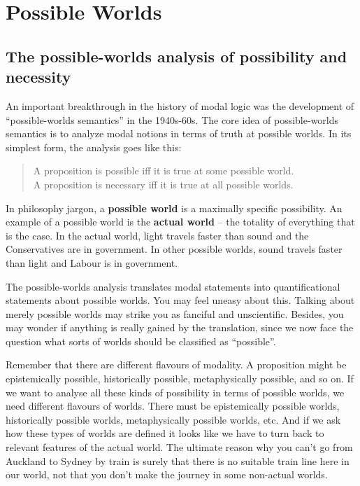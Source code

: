 \chapter{Possible Worlds}\label{ch:worlds}

\section{The possible-worlds analysis of possibility and necessity}

An important breakthrough in the history of modal logic was the development of
``possible-worlds semantics'' in the 1940s-60s.
%
%
The core idea of possible-worlds semantics is to analyze modal notions in
terms of truth at possible worlds. In its simplest form, the analysis goes like
this:
%
\begin{quote}
  A proposition is possible iff it is true at some possible world.\\
  A proposition is necessary iff it is true at all possible worlds.
\end{quote}

In philosophy jargon, a \textbf{possible world} is a maximally specific
possibility. An example of a possible world is the \textbf{actual world} -- the
totality of everything that is the case. In the actual world, light travels
faster than sound and the Conservatives are in government. In other possible
worlds, sound travels faster than light and Labour is in government.

The possible-worlds analysis translates modal statements into quantificational
statements about possible worlds. You may feel uneasy about this. Talking about
merely possible worlds may strike you as fanciful and unscientific. Besides, you
may wonder if anything is really gained by the translation, since we now face
the question what sorts of worlds should be classified as ``possible''.

Remember that there are different flavours of modality. A proposition might be
epistemically possible, historically possible, metaphysically possible, and so
on. If we want to analyse all these kinds of possibility in terms of possible
worlds, we need different flavours of worlds. There must be epistemically
possible worlds, historically possible worlds, metaphysically possible worlds,
etc. And if we ask how these types of worlds are defined it looks like we have
to turn back to relevant features of the actual world. The ultimate reason why
you can't go from Auckland to Sydney by train is surely that there is no
suitable train line here in our world, not that you don't make the journey in
some non-actual worlds.

